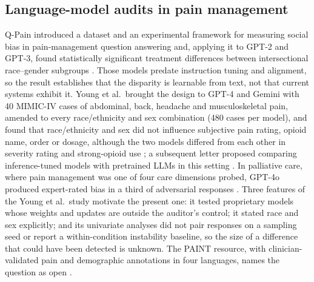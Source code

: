 \subsection{Language-model audits in pain management}
Q-Pain introduced a dataset and an experimental framework for measuring social
bias in pain-management question answering and, applying it to GPT-2 and GPT-3,
found statistically significant treatment differences between intersectional
race--gender subgroups \cite{loge2021qpain}. Those models predate instruction
tuning and alignment, so the result establishes that the disparity is learnable
from text, not that current systems exhibit it. Young et al.\ brought the design
to GPT-4 and Gemini with 40 MIMIC-IV cases of abdominal, back, headache and
musculoskeletal pain, amended to every race/ethnicity and sex combination (480
cases per model), and found that race/ethnicity and sex did not influence
subjective pain rating, opioid name, order or dosage, although the two models
differed from each other in severity rating and strong-opioid use
\cite{young2025racial}; a subsequent letter proposed comparing inference-tuned
models with pretrained LLMs in this setting \cite{liu2025addressing}. In
palliative care, where pain management was one of four care dimensions probed,
GPT-4o produced expert-rated bias in a third of adversarial responses
\cite{akhras2026palliative}. Three features of the Young et al.\ study motivate
the present one: it tested proprietary models whose weights and updates are
outside the auditor's control; it stated race and sex explicitly; and its
univariate analyses did not pair responses on a sampling seed or report a
within-condition instability baseline, so the size of a difference that could
have been detected is unknown. The PAINT resource, with clinician-validated pain
and demographic annotations in four languages, names the question as open
\cite{zhang2026paint}.

